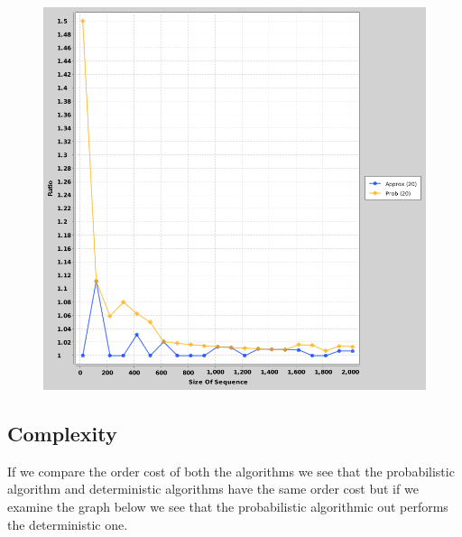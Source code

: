 \documentclass{article}
\begin{document}
			\begin{figure}[h]
				\vspace{3mm}
				\begin{center}
					\includegraphics[scale=0.4]{CompareRatios.png}
				\end{center}
			\end{figure}
			
			\break
			
		\subsection{Complexity}
			If we compare the order cost of both the algorithms we see that the probabilistic algorithm and deterministic algorithms have the same order cost but if we examine the graph below we see that the probabilistic algorithmic out performs the deterministic one.
			
\end{document}

